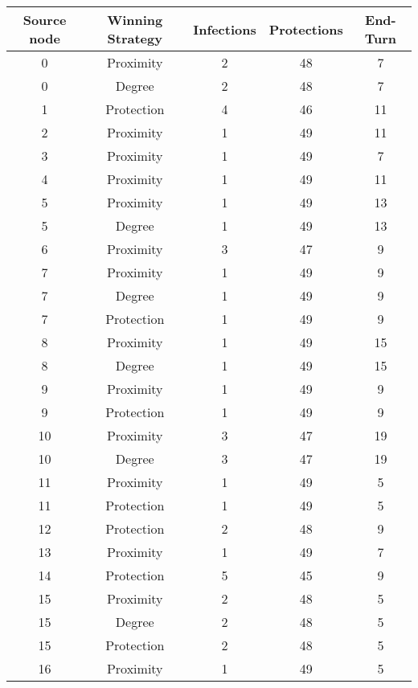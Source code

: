 \documentclass[results.tex]{subfiles}
\begin{document}
\begin{center}
  \begin{tabular}{| c || c | c | c | c |}
    \hline
    {\bfseries Source node} & {\bfseries Winning Strategy} & {\bfseries Infections} & {\bfseries Protections} & {\bfseries End-Turn} \\  %
    \hline\hline
    0 & Proximity & 2 & 48 & 7 \\ 
    \hline
    0 & Degree & 2 & 48 & 7 \\ 
    \hline
    1 & Protection & 4 & 46 & 11 \\ 
    \hline
    2 & Proximity & 1 & 49 & 11 \\ 
    \hline
    3 & Proximity & 1 & 49 & 7 \\ 
    \hline
    4 & Proximity & 1 & 49 & 11 \\ 
    \hline
    5 & Proximity & 1 & 49 & 13 \\ 
    \hline
    5 & Degree & 1 & 49 & 13 \\ 
    \hline
    6 & Proximity & 3 & 47 & 9 \\ 
    \hline
    7 & Proximity & 1 & 49 & 9 \\ 
    \hline
    7 & Degree & 1 & 49 & 9 \\ 
    \hline
    7 & Protection & 1 & 49 & 9 \\ 
    \hline
    8 & Proximity & 1 & 49 & 15 \\ 
    \hline
    8 & Degree & 1 & 49 & 15 \\ 
    \hline
    9 & Proximity & 1 & 49 & 9 \\ 
    \hline
    9 & Protection & 1 & 49 & 9 \\ 
    \hline
    10 & Proximity & 3 & 47 & 19 \\ 
    \hline
    10 & Degree & 3 & 47 & 19 \\ 
    \hline
    11 & Proximity & 1 & 49 & 5 \\ 
    \hline
    11 & Protection & 1 & 49 & 5 \\ 
    \hline
    12 & Protection & 2 & 48 & 9 \\ 
    \hline
    13 & Proximity & 1 & 49 & 7 \\ 
    \hline
    14 & Protection & 5 & 45 & 9 \\ 
    \hline
    15 & Proximity & 2 & 48 & 5 \\ 
    \hline
    15 & Degree & 2 & 48 & 5 \\ 
    \hline
    15 & Protection & 2 & 48 & 5 \\ 
    \hline
    16 & Proximity & 1 & 49 & 5 \\ 

\end{tabular}
\end{center}
\end{document}
